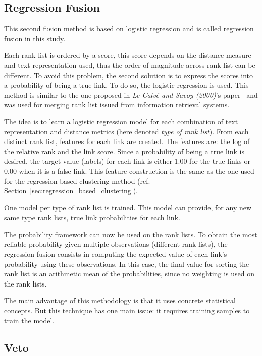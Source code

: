 \subsection{Regression Fusion \label{sec:regression_fusion}}

This second fusion method is based on logistic regression and is called regression fusion in this study.

Each rank list is ordered by a score, this score depends on the distance measure and text representation used, thus the order of magnitude across rank list can be different.
To avoid this problem, the second solution is to express the scores into a probability of being a true link.
To do so, the logistic regression is used.
This method is similar to the one proposed in \textit{Le Calvé and Savoy (2000)}'s paper~\cite{le_calve_database_merging} and was used for merging rank list issued from information retrieval systems.

The idea is to learn a logistic regression model for each combination of text representation and distance metrics (here denoted \textit{type of rank list}).
From each distinct rank list, features for each link are created.
The features are: the log of the relative rank and the link score.
Since a probability of being a true link is desired, the target value (labels) for each link is either $1.00$ for the true links or $0.00$ when it is a false link.
This feature construction is the same as the one used for the regression-based clustering method (ref. Section~\ref{sec:regression_based_clustering}).

One model per type of rank list is trained.
This model can provide, for any new same type rank lists, true link probabilities for each link.

The probability framework can now be used on the rank lists.
To obtain the most reliable probability given multiple observations (different rank lists), the regression fusion consists in computing the expected value of each link's probability using these observations.
In this case, the final value for sorting the rank list is an arithmetic mean of the probabilities, since no weighting is used on the rank lists.

The main advantage of this methodology is that it uses concrete statistical concepts.
But this technique has one main issue: it requires training samples to train the model.

\subsection{Veto}

